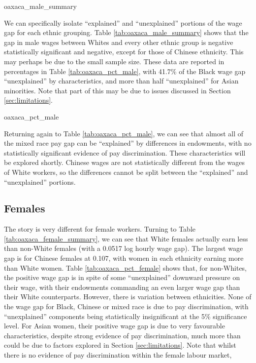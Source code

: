 \documentclass[class=article, crop=false]{standalone}
\begin{document}
{oaxaca_male_summary}

We can specifically isolate \enquote{explained} and \enquote{unexplained} portions of the wage gap for each ethnic grouping. Table \ref{tab:oaxaca_male_summary} shows that the gap in male wages between Whites and every other ethnic group is negative statistically significant and negative, except for those of Chinese ethnicity. This may perhaps be due to the small sample size. These data are reported in percentages in Table \ref{tab:oaxaca_pct_male}, with 41.7\% of the Black wage gap \enquote{unexplained} by characteristics, and more than half \enquote{unexplained} for Asian minorities. Note that part of this may be due to issues discussed in Section \ref{sec:limitations}.

{oaxaca_pct_male}

Returning again to Table \ref{tab:oaxaca_pct_male}, we can see that almost all of the mixed race pay gap can be \enquote{explained} by differences in endowments, with no statistically significant evidence of pay discrimination. These characteristics will be explored shortly. Chinese wages are not statistically different from the wages of White workers, so the differences cannot be split between the \enquote{explained} and \enquote{unexplained} portions. 

\subsection{Females}
\label{sec:Females}
The story is very different for female workers. Turning to Table \ref{tab:oaxaca_female_summary}, we can see that White females actually earn less than non-White females (with a 0.0517 log hourly wage gap). The largest wage gap is for Chinese females at 0.107, with women in each ethnicity earning more than White women. Table \ref{tab:oaxaca_pct_female} shows that, for non-Whites, the positive wage gap is in spite of some \enquote{unexplained} downward pressure on their wage, with their endowments commanding an even larger wage gap than their White counterparts. However, there is variation between ethnicities. None of the wage gap for Black, Chinese or mixed race is due to pay discrimination, with \enquote{unexplained} components being statistically insignificant at the 5\% significance level. For Asian women, their positive wage gap is due to very favourable characteristics, despite strong evidence of pay discrimination, much more than could be due to factors explored in Section \ref{sec:limitations}. Note that whilst there is no evidence of pay discrimination within the female labour market, 
\end{document}
